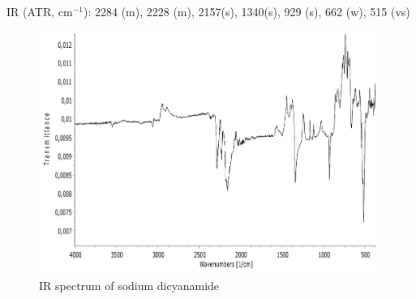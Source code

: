 \label{appendix}
IR (ATR, cm$^{-1}$): 2284 (m), 2228 (m), 2157(s), 1340(s), 929 (s), 662 (w), 515 (vs)

\begin{figure}[h!]
\includegraphics[width=1\textwidth]{figures/Na-dca-IR.pdf}
\caption*{IR spectrum of sodium dicyanamide}
\label{fig:dca-ir}
\end{figure}




